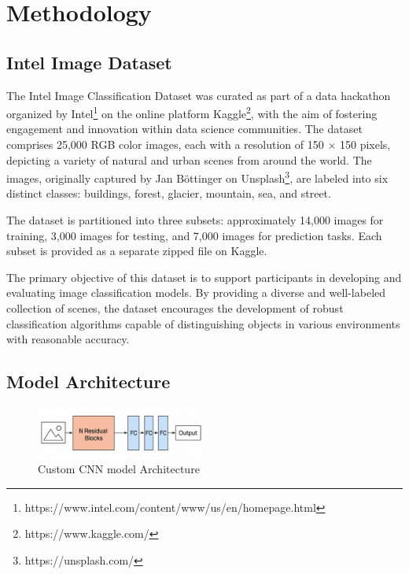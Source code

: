 \section{Methodology}

\subsection{Intel Image Dataset}

The Intel Image Classification Dataset \cite{intel_image_classification_kaggle} was curated
as part of a data hackathon organized
by Intel\footnote{https://www.intel.com/content/www/us/en/homepage.html}
on the online platform Kaggle\footnote{https://www.kaggle.com/},
with the aim of fostering engagement and innovation within data science communities.
The dataset comprises 25,000 RGB color images,
each with a resolution of 150 $\times$ 150 pixels,
depicting a variety of natural and urban scenes from around the world.
The images, originally captured by Jan Böttinger
on Unsplash\footnote{https://unsplash.com/},
are labeled into six distinct classes: buildings, forest, glacier, mountain, sea, and street.

The dataset is partitioned into three subsets: approximately 14,000 images for training,
3,000 images for testing, and 7,000 images for prediction tasks.
Each subset is provided as a separate zipped file on Kaggle.

The primary objective of this dataset is to support participants
in developing and evaluating image classification models.
By providing a diverse and well-labeled collection of scenes,
the dataset encourages the development of robust classification algorithms
capable of distinguishing objects in various environments with reasonable accuracy.

\subsection{Model Architecture}
\label{sec:method:model_architecture}

\begin{figure}[ht]
    \centering
    \includegraphics[width=0.5\textwidth]{assets/model-architecture.png}
    \caption{Custom CNN model Architecture}
    \label{fig:model_architecture}
\end{figure}

